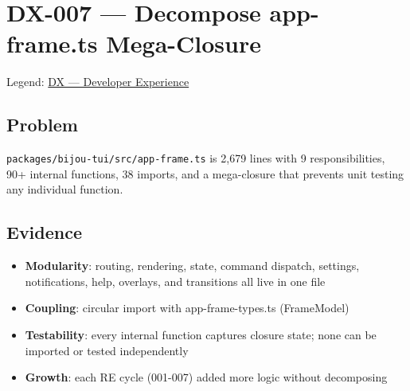 \chapter{DX-007 --- Decompose app-frame.ts Mega-Closure}\label{record-339}

\smallskip

Legend: \href{https://github.com/flyingrobots/bijou/blob/cbd70612140e7a450d764b3c7be1c6af878b99bc/docs/method/graveyard/legends/DX-developer-experience.md}{DX --- Developer Experience}

\section{Problem}\label{record-339-problem}

\texttt{p\allowbreak{}a\allowbreak{}c\allowbreak{}k\allowbreak{}a\allowbreak{}g\allowbreak{}e\allowbreak{}s\allowbreak{}/\allowbreak{}b\allowbreak{}i\allowbreak{}j\allowbreak{}o\allowbreak{}u\allowbreak{}-\allowbreak{}t\allowbreak{}u\allowbreak{}i\allowbreak{}/\allowbreak{}s\allowbreak{}r\allowbreak{}c\allowbreak{}/\allowbreak{}a\allowbreak{}p\allowbreak{}p\allowbreak{}-\allowbreak{}f\allowbreak{}r\allowbreak{}a\allowbreak{}m\allowbreak{}e\allowbreak{}.\allowbreak{}t\allowbreak{}s} is 2,679 lines with 9 responsibilities, 90+ internal functions, 38 imports, and a mega-closure that prevents unit testing any individual function.

\section{Evidence}\label{record-339-evidence}

\begin{itemize}
\tightlist
\item
  \textbf{Modularity}: routing, rendering, state, command dispatch, settings, notifications, help, overlays, and transitions all live in one file
\item
  \textbf{Coupling}: circular import with app-frame-types.ts (FrameModel)
\item
  \textbf{Testability}: every internal function captures closure state; none can be imported or tested independently
\item
  \textbf{Growth}: each RE cycle (001-007) added more logic without decomposing
\end{itemize}

